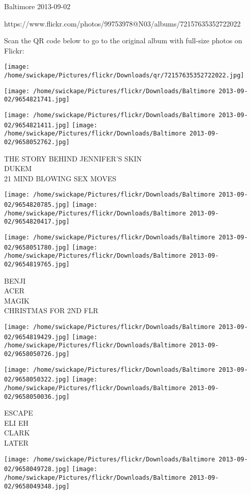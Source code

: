 \documentclass[10pt,letterpaper]{article}
\begin{document}
Baltimore 2013-09-02

https://www.flickr.com/photos/99753978@N03/albums/72157635352722022

Scan the QR code below to go to the original album with full-size photos on Flickr:

\texttt{[image: /home/swickape/Pictures/flickr/Downloads/qr/72157635352722022.jpg]}
\pagebreak

\texttt{[image: /home/swickape/Pictures/flickr/Downloads/Baltimore 2013-09-02/9654821741.jpg]}

\vspace{0.25in}
\texttt{[image: /home/swickape/Pictures/flickr/Downloads/Baltimore 2013-09-02/9654821411.jpg]}
\texttt{[image: /home/swickape/Pictures/flickr/Downloads/Baltimore 2013-09-02/9658052762.jpg]}

THE STORY BEHIND JENNIFER'S SKIN\\
DUKEM\\
21 MIND BLOWING SEX MOVES
\pagebreak

\texttt{[image: /home/swickape/Pictures/flickr/Downloads/Baltimore 2013-09-02/9654820785.jpg]}
\texttt{[image: /home/swickape/Pictures/flickr/Downloads/Baltimore 2013-09-02/9654820417.jpg]}

\texttt{[image: /home/swickape/Pictures/flickr/Downloads/Baltimore 2013-09-02/9658051780.jpg]}
\texttt{[image: /home/swickape/Pictures/flickr/Downloads/Baltimore 2013-09-02/9654819765.jpg]}

BENJI\\
ACER\\
MAGIK\\
CHRISTMAS FOR 2ND FLR
\pagebreak

\texttt{[image: /home/swickape/Pictures/flickr/Downloads/Baltimore 2013-09-02/9654819429.jpg]}
\texttt{[image: /home/swickape/Pictures/flickr/Downloads/Baltimore 2013-09-02/9658050726.jpg]}

\texttt{[image: /home/swickape/Pictures/flickr/Downloads/Baltimore 2013-09-02/9658050322.jpg]}
\texttt{[image: /home/swickape/Pictures/flickr/Downloads/Baltimore 2013-09-02/9658050036.jpg]}

ESCAPE\\
ELI EH\\
CLARK\\
LATER
\pagebreak

\texttt{[image: /home/swickape/Pictures/flickr/Downloads/Baltimore 2013-09-02/9658049728.jpg]}
\texttt{[image: /home/swickape/Pictures/flickr/Downloads/Baltimore 2013-09-02/9658049348.jpg]}
\end{document}
